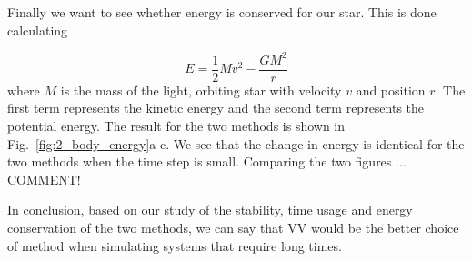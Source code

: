 \documentclass{article}
\begin{document}
\begin{multicols}{2}
Finally we want to see whether energy is conserved for our star. This is done calculating

\begin{equation}\label{eq:E_tot}
	E = \frac{1}{2}Mv^2 - \frac{GM^2}{r}
\end{equation}
where $M$ is the mass of the light, orbiting star with velocity $v$ and position $r$. The first term represents the kinetic energy and the second term represents the potential energy. The result for the two methods is shown in Fig.~\ref{fig:2_body_energy}a-c. We see that the change in energy is identical for the two methods when the time step is small. Comparing the two figures ... COMMENT!

In conclusion, based on our study of the stability, time usage and energy conservation of the two methods, we can say that VV would be the better choice of method when simulating systems that require long times.



\end{multicols}
\end{document}
